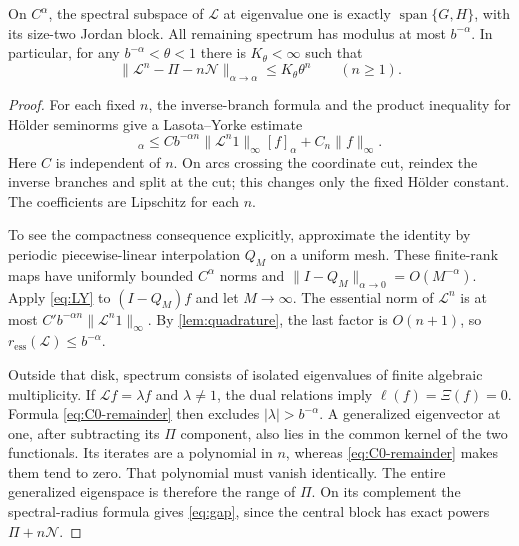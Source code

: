 \documentclass[11pt,a4paper]{article}
\numberwithin{equation}{section}
\theoremstyle{definition}
\theoremstyle{remark}
\newcommand{\Lop}{\mathcal L}
\newcommand{\Proj}{\Pi}
\newcommand{\rhoess}{r_{\mathrm{ess}}}
\begin{document}
\begin{proposition}
\label{prop:gap}
On $C^\alpha$, the spectral subspace of $\Lop$ at eigenvalue one is
exactly $\operatorname{span}\{G,H\}$, with its size-two Jordan block.
All remaining spectrum has modulus at most $b^{-\alpha}$. In particular,
for any $b^{-\alpha}<\theta<1$ there is $K_\theta<\infty$ such that
\begin{equation}
 \|\Lop^n-\Proj-n\mathcal N\|_{\alpha\to\alpha}
 \le K_\theta\theta^n\qquad(n\ge1).
 \label{eq:gap}
\end{equation}
\end{proposition}
\begin{proof}
For each fixed $n$, the inverse-branch formula and the product inequality
for H\"older seminorms give a Lasota--Yorke estimate
\begin{equation}
 [\Lop^n f]_\alpha\le
 C b^{-\alpha n}\|\Lop^n1\|_\infty[f]_\alpha+C_n\|f\|_\infty.
 \label{eq:LY}
\end{equation}
Here $C$ is independent of $n$. On arcs crossing the coordinate cut,
reindex the inverse branches and split at the cut; this changes only the
fixed H\"older constant. The coefficients are Lipschitz for each $n$.

To see the compactness consequence explicitly, approximate the identity
by periodic piecewise-linear interpolation $Q_M$ on a uniform mesh.
These finite-rank maps have uniformly bounded $C^\alpha$ norms and
$\|I-Q_M\|_{\alpha\to0}=O(M^{-\alpha})$. Apply \cref{eq:LY} to
$(I-Q_M)f$ and let $M\to\infty$. The essential norm of $\Lop^n$ is at
most $C' b^{-\alpha n}\|\Lop^n1\|_\infty$.
By \cref{lem:quadrature}, the last factor is $O(n+1)$, so
$\rhoess(\Lop)\le b^{-\alpha}$.

Outside that disk, spectrum consists of isolated eigenvalues of finite
algebraic multiplicity. If $\Lop f=\lambda f$ and $\lambda\ne1$, the dual
relations imply $\ell(f)=\Xi(f)=0$. Formula \cref{eq:C0-remainder}
then excludes $|\lambda|>b^{-\alpha}$. A generalized eigenvector at one,
after subtracting its $\Proj$ component, also lies in the common kernel
of the two functionals. Its iterates are a polynomial in $n$, whereas
\cref{eq:C0-remainder} makes them tend to zero. That polynomial must
vanish identically. The entire generalized eigenspace is therefore the
range of $\Proj$. On its complement the spectral-radius formula gives
\cref{eq:gap}, since the central block has exact powers
$\Proj+n\mathcal N$.
\end{proof}
\end{document}
